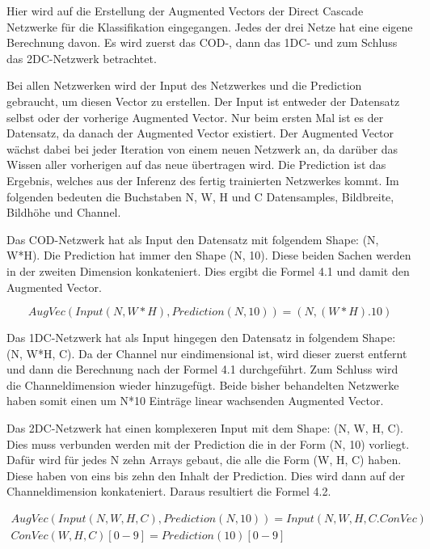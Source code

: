 Hier wird auf die Erstellung der Augmented Vectors der Direct Cascade Netzwerke für die Klassifikation eingegangen. Jedes der drei Netze hat 
eine eigene Berechnung davon. Es wird zuerst das COD-, dann das 1DC- und zum Schluss das 2DC-Netzwerk betrachtet. 

Bei allen Netzwerken wird der Input des Netzwerkes und die Prediction gebraucht, um diesen Vector zu erstellen. Der Input ist entweder der 
Datensatz selbst oder der vorherige Augmented Vector. Nur beim ersten Mal ist es der Datensatz, da danach der Augmented Vector existiert. 
Der Augmented Vector wächst dabei bei jeder Iteration von einem neuen Netzwerk an, da darüber das Wissen aller vorherigen auf das neue 
übertragen wird. 
Die Prediction ist das Ergebnis, welches aus der Inferenz des fertig trainierten Netzwerkes kommt. Im folgenden bedeuten die Buchstaben N, W, 
H und C Datensamples, Bildbreite, Bildhöhe und Channel. 

Das COD-Netzwerk hat als Input den Datensatz mit folgendem Shape: (N, W*H). 
Die Prediction hat immer den Shape (N, 10). 
Diese beiden Sachen werden in der zweiten Dimension konkateniert. Dies ergibt die Formel 4.1 und damit den Augmented Vector. 

\begin{equation}
    AugVec(Input(N, W*H), Prediction(N, 10)) = (N, (W*H).10)
\end{equation}

Das 1DC-Netzwerk hat als Input hingegen den Datensatz in folgendem Shape: (N, W*H, C). Da der Channel nur eindimensional ist, wird dieser 
zuerst entfernt und dann die Berechnung nach der Formel 4.1 durchgeführt. Zum Schluss wird die Channeldimension wieder hinzugefügt. 
Beide bisher behandelten Netzwerke haben somit einen um N*10 Einträge linear wachsenden Augmented Vector. 

Das 2DC-Netzwerk hat einen komplexeren Input mit dem Shape: (N, W, H, C). Dies muss verbunden werden mit der Prediction die in der Form (N, 10) 
vorliegt. Dafür wird für jedes N zehn Arrays gebaut, die alle die Form (W, H, C) haben. Diese haben von eins bis zehn den Inhalt der Prediction. 
Dies wird dann auf der Channeldimension konkateniert. Daraus resultiert die Formel 4.2. 

\begin{multline}
    AugVec(Input(N, W, H, C), Prediction(N, 10)) = Input(N, W, H, C.ConVec)\\
    ConVec(W, H, C)[0-9] = Prediction(10)[0-9]
\end{multline}

